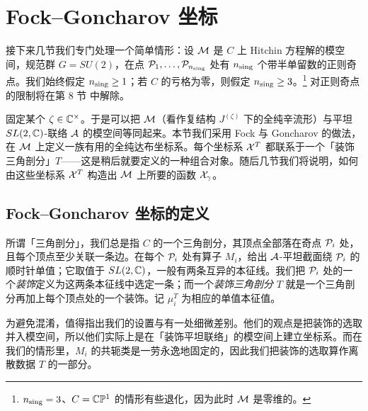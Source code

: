 
\section{Fock--Goncharov 坐标}
\label{sec:fg-coordinates}

接下来几节我们专门处理一个简单情形：设 $\mathcal{M}$ 是 $C$ 上 Hitchin 方程解的模空间，规范群 $G=SU(2)$，在点 $\mathcal{P}_1,\dots,\mathcal{P}_{n_{\rm sing}}$ 处有 $n_{\rm sing}$ 个带半单留数的正则奇点。我们始终假定 $n_{\rm sing}\ge 1$；若 $C$ 的亏格为零，则假定 $n_{\rm sing}\ge 3$。\footnote{$n_{\rm sing}=3$、$C=\mathbb{C}\mathbb{P}^1$ 的情形有些退化，因为此时 $\mathcal{M}$ 是零维的。} 对正则奇点的限制将在第 8 节%
中解除。

固定某个 $\zeta\in\mathbb{C}^\times$。于是可以把 $\mathcal{M}$（看作复结构 $J^{(\zeta)}$ 下的全纯辛流形）与平坦 $SL(2,\mathbb{C})$-联络 $\mathcal{A}$ 的模空间等同起来。本节我们采用 Fock 与 Goncharov 的做法\cite{MR2233852}，在 $\mathcal{M}$ 上定义一族有用的全纯达布坐标系。每个坐标系 $\mathcal{X}^T$ 都联系于一个「装饰三角剖分」$T$——这是稍后就要定义的一种组合对象。随后几节我们将说明，如何由这些坐标系 $\mathcal{X}^T$ 构造出 $\mathcal{M}$ 上所要的函数 $\mathcal{X}_\gamma$。

\subsection{Fock--Goncharov 坐标的定义}

所谓「三角剖分」，我们总是指 $C$ 的一个三角剖分，其顶点全部落在奇点 $\mathcal{P}_i$ 处，且每个顶点至少关联一条边。在每个 $\mathcal{P}_i$ 处有算子 $M_i$，给出 $\mathcal{A}$-平坦截面绕 $\mathcal{P}_i$ 的顺时针单值；它取值于 $SL(2,\mathbb{C})$，一般有两条互异的本征线。我们把 $\mathcal{P}_i$ 处的一个\emph{装饰}定义为这两条本征线中选定一条；而一个\emph{装饰三角剖分} $T$ 就是一个三角剖分再加上每个顶点处的一个装饰。记 $\mu^T_i$ 为相应的单值本征值。

为避免混淆，值得指出我们的设置与\cite{MR2233852}有一处细微差别。他们的观点是把装饰的选取并入模空间，所以他们实际上是在「装饰平坦联络」的模空间上建立坐标系。而在我们的情形里，$M_i$ 的共轭类是一劳永逸地固定的，因此我们把装饰的选取算作离散数据 $T$ 的一部分。


